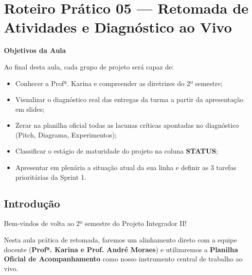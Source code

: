 
\section{Roteiro Prático 05 — Retomada de Atividades e Diagnóstico ao Vivo}


\begin{boxObjetivos}
\textbf{Objetivos da Aula}

Ao final desta aula, cada grupo de projeto será capaz de:

\begin{itemize}
\item Conhecer a Profª. Karina e compreender as diretrizes do 2º semestre;
\item Visualizar o diagnóstico real das entregas da turma a partir da apresentação em slides;
\item Zerar na planilha oficial todas as lacunas críticas apontadas no diagnóstico (Pitch, Diagrama, Experimentos);
\item Classificar o estágio de maturidade do projeto na coluna \textbf{STATUS};
\item Apresentar em plenária a situação atual da sua linha e definir as 3 tarefas prioritárias da Sprint 1.
\end{itemize}
\end{boxObjetivos}


\subsection{Introdução}

Bem-vindos de volta ao 2º semestre do Projeto Integrador II! 

Nesta aula prática de retomada, faremos um alinhamento direto com a equipe docente (\textbf{Profª. Karina e Prof. André Moraes}) e utilizaremos a \textbf{Planilha Oficial de Acompanhamento} como nosso instrumento central de trabalho ao vivo.

\vspace{0.3cm}

